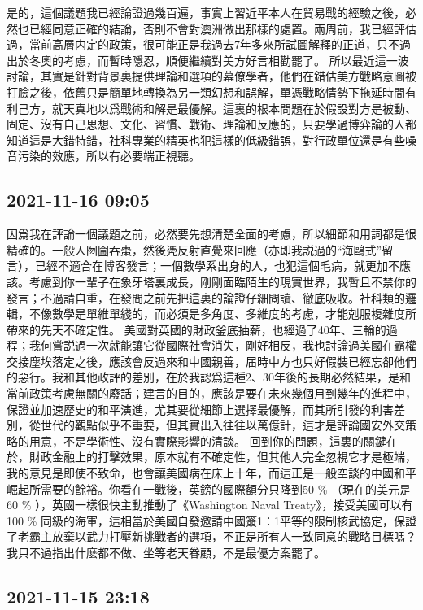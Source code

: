 \documentclass[twocolumn]{ctexart}
\begin{document}
是的，這個議題我已經論證過幾百遍，事實上習近平本人在貿易戰的經驗之後，必然也已經同意正確的結論，否則不會對澳洲做出那樣的處置。兩周前，我已經評估過，當前高層内定的政策，很可能正是我過去7年多來所試圖解釋的正道，只不過出於冬奧的考慮，而暫時隱忍，順便繼續對美方好言相勸罷了。
所以最近這一波討論，其實是針對背景裏提供理論和選項的幕僚學者，他們在錯估美方戰略意圖被打臉之後，依舊只是簡單地轉換為另一類幻想和誤解，單憑戰略情勢下拖延時間有利己方，就天真地以爲戰術和解是最優解。這裏的根本問題在於假設對方是被動、固定、沒有自己思想、文化、習慣、戰術、理論和反應的，只要學過博弈論的人都知道這是大錯特錯，社科專業的精英也犯這樣的低級錯誤，對行政單位還是有些噪音污染的效應，所以有必要端正視聽。
\subsection*{2021-11-16 09:05}

因爲我在評論一個議題之前，必然要先想清楚全面的考慮，所以細節和用詞都是很精確的。一般人囫圇吞棗，然後凴反射直覺來回應（亦即我説過的“海鷗式”留言），已經不適合在博客發言；一個數學系出身的人，也犯這個毛病，就更加不應該。考慮到你一輩子在象牙塔裏成長，剛剛面臨陌生的現實世界，我暫且不禁你的發言；不過請自重，在發問之前先把這裏的論證仔細閲讀、徹底吸收。社科類的邏輯，不像數學是單維單綫的，而必須是多角度、多維度的考慮，才能剋服複雜度所帶來的先天不確定性。
美國對英國的財政釜底抽薪，也經過了40年、三輪的過程；我何嘗説過一次就能讓它從國際社會消失，剛好相反，我也討論過美國在霸權交接塵埃落定之後，應該會反過來和中國親善，届時中方也只好假裝已經忘卻他們的惡行。我和其他政評的差別，在於我認爲這種2、30年後的長期必然結果，是和當前政策考慮無關的廢話；建言的目的，應該是要在未來幾個月到幾年的進程中，保證並加速歷史的和平演進，尤其要從細節上選擇最優解，而其所引發的利害差別，從世代的觀點似乎不重要，但其實出入往往以萬億計，這才是評論國安外交策略的用意，不是學術性、沒有實際影響的清談。
回到你的問題，這裏的關鍵在於，財政金融上的打擊效果，原本就有不確定性，但其他人完全忽視它才是極端，我的意見是即使不致命，也會讓美國病在床上十年，而這正是一般空談的中國和平崛起所需要的餘裕。你看在一戰後，英鎊的國際額分只降到50 \% （現在的美元是60 \% ），英國一樣很快主動推動了《Washington Naval Treaty》，接受美國可以有100 \% 同級的海軍，這相當於美國自發邀請中國簽1：1平等的限制核武協定，保證了老霸主放棄以武力打壓新挑戰者的選項，不正是所有人一致同意的戰略目標嗎？我只不過指出什麽都不做、坐等老天眷顧，不是最優方案罷了。
\subsection*{2021-11-15 23:18}
\end{document}
